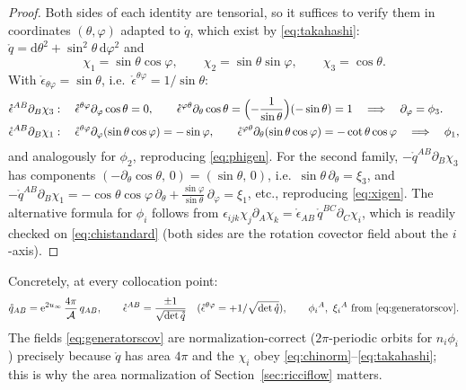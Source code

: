 \documentclass[11pt]{article}
\newcommand{\dd}{\mathrm{d}}
\newcommand{\ee}{\mathrm{e}}
\newcommand{\qo}{\mathring{q}}          %
\newcommand{\epso}{\mathring{\epsilon}} %
\begin{document}
\begin{proof}
Both sides of each identity are tensorial, so it suffices to verify them in
coordinates $(\theta,\varphi)$ adapted to $\qo$, which exist by
\eqref{eq:takahashi}: $\qo = \dd\theta^2+\sin^2\!\theta\,\dd\varphi^2$ and
\begin{equation}
  \chi_1 = \sin\theta\cos\varphi,\qquad
  \chi_2 = \sin\theta\sin\varphi,\qquad
  \chi_3 = \cos\theta .
  \label{eq:chistandard}
\end{equation}
With $\epso_{\theta\varphi} = \sin\theta$, i.e.\
$\epso^{\theta\varphi} = 1/\sin\theta$:
\begin{align*}
  \epso^{AB}\partial_B\chi_3 &:\quad
  \epso^{\theta\varphi}\partial_\varphi\cos\theta = 0,\qquad
  \epso^{\varphi\theta}\partial_\theta\cos\theta
  = \Bigl(-\frac{1}{\sin\theta}\Bigr)(-\sin\theta) = 1
  \quad\Longrightarrow\quad \partial_\varphi = \phi_3 . \\
  \epso^{AB}\partial_B\chi_1 &:\quad
  \epso^{\theta\varphi}\partial_\varphi(\sin\theta\cos\varphi)
  = -\sin\varphi,\qquad
  \epso^{\varphi\theta}\partial_\theta(\sin\theta\cos\varphi)
  = -\cot\theta\cos\varphi
  \quad\Longrightarrow\quad \phi_1 ,
\end{align*}
and analogously for $\phi_2$, reproducing \eqref{eq:phigen}.  For the second
family, $-\qo^{AB}\partial_B\chi_3$ has components
$(-\partial_\theta\cos\theta,\,0) = (\sin\theta,\,0)$, i.e.\
$\sin\theta\,\partial_\theta = \xi_3$, and
$-\qo^{AB}\partial_B\chi_1 = -\cos\theta\cos\varphi\,\partial_\theta +
\frac{\sin\varphi}{\sin\theta}\,\partial_\varphi = \xi_1$, etc., reproducing
\eqref{eq:xigen}.  The alternative formula for $\phi_i$ follows from
$\epsilon_{ijk}\chi_j\partial_A\chi_k = \epso_{AB}\,\qo^{BC}\partial_C\chi_i$,
which is readily checked on \eqref{eq:chistandard} (both sides are the
rotation covector field about the $i$-axis).
\end{proof}

Concretely, at every collocation point:
\begin{equation}
  \qo_{AB} = \ee^{2u_\infty}\,\frac{4\pi}{\mathcal{A}}\,q_{AB},
  \qquad
  \epso^{AB}
  = \frac{\pm 1}{\sqrt{\det\qo}}
  \quad (\epso^{\theta\varphi} = +1/\sqrt{\det\qo}),
  \qquad
  \phi_i{}^A,\ \xi_i{}^A \text{ from \eqref{eq:generatorscov}}.
  \label{eq:generatorseval}
\end{equation}
The fields \eqref{eq:generatorscov} are normalization-correct ($2\pi$-periodic
orbits for $n_i\phi_i$) precisely because $\qo$ has area $4\pi$ and the
$\chi_i$ obey \eqref{eq:chinorm}--\eqref{eq:takahashi}; this is why the area
normalization of Section~\ref{sec:ricciflow} matters.
\end{document}

